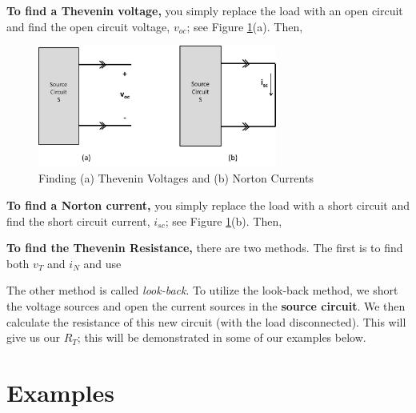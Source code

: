 \documentclass{handout}
\begin{document}
\textbf{To find a Thevenin voltage,} you simply replace the load with an open circuit and find the open circuit voltage, $v_{oc}$; see Figure \ref{fig: v_oc_i_sc}(a). Then,
\begin{figure} [h t b]
\centering
\includegraphics[width=0.7\textwidth]{v_oc_i_sc.jpg}
\caption{Finding (a) Thevenin Voltages and (b) Norton Currents}
\label{fig: v_oc_i_sc}
\end{figure}

\textbf{To find a Norton current,} you simply replace the load with a short circuit and find the short circuit current, $i_{sc}$; see Figure \ref{fig: v_oc_i_sc}(b). Then,


\textbf{To find the Thevenin Resistance,} there are two methods.  The first is to find both $v_T$ and $i_N$ and use

The other method is called {\em look-back}. To utilize the look-back method, we short the voltage sources and open the current sources in the \textbf{source circuit}.  We then calculate the resistance of this new circuit (with the load disconnected).  This will give us our $R_T$; this will be demonstrated in some of our examples below.

\newpage
\clearpage
\pagebreak

\section{Examples}
\end{document}
